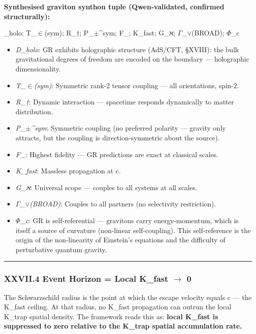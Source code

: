 \documentclass[12pt,a4paper]{article}
\begin{document}
\textbf{Synthesised graviton synthon tuple (Qwen-validated, confirmed structurally):}

\langleD\_holo; T\_$\in$(sym); R\_†; P\_$\pm$\^{}sym; F\_\hbar; K\_fast; G\_ℵ; $\Gamma$\_$\lor$(BROAD); $\Phi$\_c\rangle

\begin{itemize}
    \item \emph{D\_holo}: GR exhibits holographic structure (AdS/CFT, §XVIII): the bulk gravitational degrees of freedom are encoded on the boundary --- holographic dimensionality.
    \item \emph{T\_$\in$(sym)}: Symmetric rank-2 tensor coupling --- all orientations, spin-2.
    \item \emph{R\_†}: Dynamic interaction --- spacetime responds dynamically to matter distribution.
    \item \emph{P\_$\pm$\^{}sym}: Symmetric coupling (no preferred polarity --- gravity only attracts, but the coupling is direction-symmetric about the source).
    \item \emph{F\_\hbar}: Highest fidelity --- GR predictions are exact at classical scales.
    \item \emph{K\_fast}: Massless propagation at c.
    \item \emph{G\_ℵ}: Universal scope --- couples to all systems at all scales.
    \item \emph{$\Gamma$\_$\lor$(BROAD)}: Couples to all partners (no selectivity restriction).
    \item \emph{$\Phi$\_c}: GR is self-referential --- gravitons carry energy-momentum, which is itself a source of curvature (non-linear self-coupling). This self-reference is the origin of the non-linearity of Einstein's equations and the difficulty of perturbative quantum gravity.
\end{itemize}

\begin{center}
\rule{0.5\textwidth}{0.4pt}
\end{center}

\subsubsection{XXVII.4 Event Horizon = Local K\_fast $\rightarrow$ 0}

The Schwarzschild radius is the point at which the escape velocity equals c --- the K\_fast ceiling. At that radius, no K\_fast propagation can outrun the local K\_trap spatial density. The framework reads this as: \textbf{local K\_fast is suppressed to zero relative to the K\_trap spatial accumulation rate.}
\end{document}
